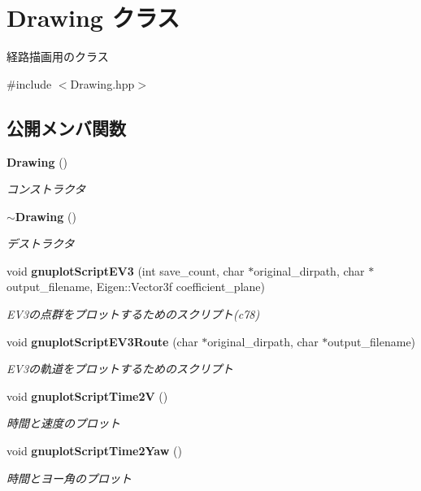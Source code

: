 \section{Drawing クラス}
\label{class_drawing}


経路描画用のクラス  




{\ttfamily \#include $<$Drawing.\-hpp$>$}

\subsection*{公開メンバ関数}
\begin{DoxyCompactItemize}
\item 
{\bf Drawing} ()
\begin{DoxyCompactList}\small\item\em コンストラクタ \end{DoxyCompactList}\item 
{\bf $\sim$\-Drawing} ()
\begin{DoxyCompactList}\small\item\em デストラクタ \end{DoxyCompactList}\item 
void {\bf gnuplot\-Script\-E\-V3} (int save\-\_\-count, char $\ast$original\-\_\-dirpath, char $\ast$output\-\_\-filename, Eigen\-::\-Vector3f coefficient\-\_\-plane)
\begin{DoxyCompactList}\small\item\em E\-V3の点群をプロットするためのスクリプト(c78) \end{DoxyCompactList}\item 
void {\bf gnuplot\-Script\-E\-V3\-Route} (char $\ast$original\-\_\-dirpath, char $\ast$output\-\_\-filename)
\begin{DoxyCompactList}\small\item\em E\-V3の軌道をプロットするためのスクリプト \end{DoxyCompactList}\item 
void {\bf gnuplot\-Script\-Time2\-V} ()
\begin{DoxyCompactList}\small\item\em 時間と速度のプロット \end{DoxyCompactList}\item 
void {\bf gnuplot\-Script\-Time2\-Yaw} ()
\begin{DoxyCompactList}\small\item\em 時間とヨー角のプロット \end{DoxyCompactList}\end{DoxyCompactItemize}


